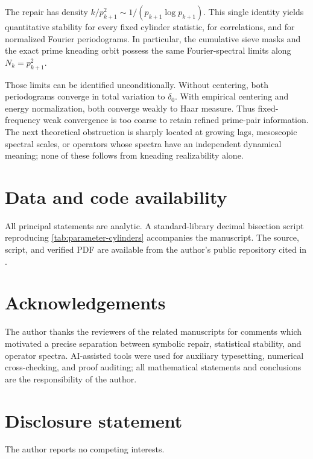 \documentclass[11pt]{article}
\theoremstyle{definition}
\theoremstyle{remark}
\begin{document}
The repair has density $k/p_{k+1}^2\sim1/(p_{k+1}\log p_{k+1})$.  This single identity yields quantitative stability for every fixed cylinder statistic, for correlations, and for normalized Fourier periodograms.  In particular, the cumulative sieve masks and the exact prime kneading orbit possess the same Fourier-spectral limits along $N_k=p_{k+1}^2$.

Those limits can be identified unconditionally.  Without centering, both periodograms converge in total variation to $\delta_0$.  With empirical centering and energy normalization, both converge weakly to Haar measure.  Thus fixed-frequency weak convergence is too coarse to retain refined prime-pair information.  The next theoretical obstruction is sharply located at growing lags, mesoscopic spectral scales, or operators whose spectra have an independent dynamical meaning; none of these follows from kneading realizability alone.

\section*{Data and code availability}

All principal statements are analytic.  A standard-library decimal bisection script reproducing \cref{tab:parameter-cylinders} accompanies the manuscript.  The source, script, and verified PDF are available from the author's public repository cited in \citet{WangReformulation2026}.

\section*{Acknowledgements}

The author thanks the reviewers of the related manuscripts for comments which motivated a precise separation between symbolic repair, statistical stability, and operator spectra.  AI-assisted tools were used for auxiliary typesetting, numerical cross-checking, and proof auditing; all mathematical statements and conclusions are the responsibility of the author.

\section*{Disclosure statement}

The author reports no competing interests.



\end{document}

